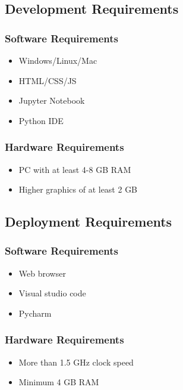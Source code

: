 \subsection{Development Requirements}
\vspace{-18pt}
\subsubsection{Software Requirements}
\vspace{-10pt}
\begin{itemize}
\item Windows/Linux/Mac
\item HTML/CSS/JS
\item Jupyter Notebook
\item Python IDE
\end{itemize}
\subsubsection{Hardware Requirements}
\vspace{-10pt}
\begin{itemize}
\item PC with at least 4-8 GB RAM
\item  Higher graphics of at least 2 GB
\end{itemize}
\subsection{Deployment Requirements}
\vspace{-18pt}
\subsubsection{Software Requirements}
\vspace{-10pt}
\begin{itemize}
\item Web browser
\item Visual studio code
\item Pycharm
\end{itemize}
\vspace{-10pt}
\subsubsection{Hardware Requirements}
\vspace{-10pt}
\begin{itemize}
\item More than 1.5 GHz clock speed
\item Minimum 4 GB RAM
\end{itemize}
\label{tblSampleTable}
